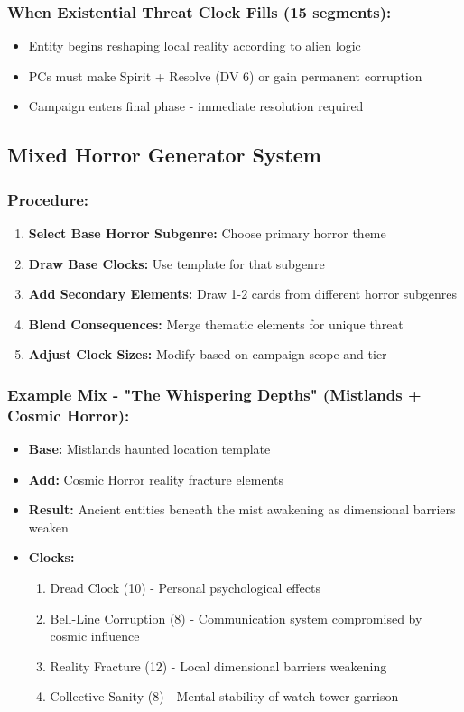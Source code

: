 \documentclass[11pt]{article}
\begin{document}
\subsubsection{When Existential Threat Clock Fills (15 segments):}
\begin{itemize}
\item Entity begins reshaping local reality according to alien logic
\item PCs must make Spirit + Resolve (DV 6) or gain permanent corruption
\item Campaign enters final phase - immediate resolution required
\end{itemize}

\subsection{Mixed Horror Generator System}

\subsubsection{Procedure:}
\begin{enumerate}
\item \textbf{Select Base Horror Subgenre:} Choose primary horror theme
\item \textbf{Draw Base Clocks:} Use template for that subgenre
\item \textbf{Add Secondary Elements:} Draw 1-2 cards from different horror subgenres
\item \textbf{Blend Consequences:} Merge thematic elements for unique threat
\item \textbf{Adjust Clock Sizes:} Modify based on campaign scope and tier
\end{enumerate}

\subsubsection{Example Mix - "The Whispering Depths" (Mistlands + Cosmic Horror):}
\begin{itemize}
\item \textbf{Base:} Mistlands haunted location template
\item \textbf{Add:} Cosmic Horror reality fracture elements
\item \textbf{Result:} Ancient entities beneath the mist awakening as dimensional barriers weaken
\item \textbf{Clocks:}
  \begin{enumerate}
  \item Dread Clock (10) - Personal psychological effects
  \item Bell-Line Corruption (8) - Communication system compromised by cosmic influence
  \item Reality Fracture (12) - Local dimensional barriers weakening
  \item Collective Sanity (8) - Mental stability of watch-tower garrison
  \end{enumerate}
\end{itemize}
\end{document}
